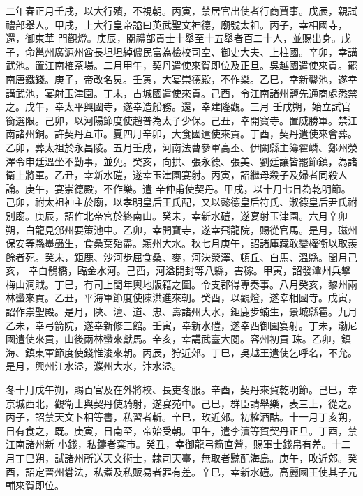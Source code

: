 \begin{pinyinscope}
 二年春正月壬戌，以大行殯，不視朝。丙寅，禁居官出使者行商賈事。戊辰，親試禮部舉人。甲戌，上大行皇帝謚曰英武聖文神德，廟號太祖。丙子，幸相國寺，還，御東華
 門觀燈。庚辰，閱禮部貢士十舉至十五舉者百二十人，並賜出身。戊子，命邕州廣源州酋長坦坦綽儂民富為檢校司空、御史大夫、上柱國。辛卯，幸講武池。置江南榷茶場。二月甲午，契丹遣使來賀即位及正旦。吳越國遣使來貢。罷南唐鐵錢。庚子，帝改名炅。壬寅，大宴崇德殿，不作樂。乙巳，幸新鑿池，遂幸講武池，宴射玉津園。丁未，占城國遣使來貢。己酉，令江南諸州鹽先通商處悉禁之。戊午，幸太平興國寺，遂幸造船務。還，幸建隆觀。三月
 壬戌朔，始立試官銜選限。己卯，以河陽節度使趙普為太子少保。己丑，幸開寶寺。置威勝軍。禁江南諸州銅。許契丹互市。夏四月辛卯，大食國遣使來貢。丁酉，契丹遣使來會葬。乙卯，葬太祖於永昌陵。五月壬戌，河南法曹參軍高丕、伊闕縣主簿翟嶙、鄭州滎澤令申廷溫坐不勤事，並免。癸亥，向拱、張永德、張美、劉廷讓皆罷節鎮，為諸衛上將軍。乙丑，幸新水磑，遂幸玉津園宴射。丙寅，詔繼母殺子及婦者同殺人論。庚午，宴崇德殿，不作樂。遣
 辛仲甫使契丹。甲戌，以十月七日為乾明節。己卯，祔太祖神主於廟，以孝明皇后王氏配，又以懿德皇后符氏、淑德皇后尹氏祔別廟。庚辰，詔作北帝宮於終南山。癸未，幸新水磑，遂宴射玉津園。六月辛卯朔，白龍見邠州要策池中。乙卯，幸開寶寺，遂幸飛龍院，賜從官馬。是月，磁州保安等縣墨蟲生，食桑葉殆盡。穎州大水。秋七月庚午，詔諸庫藏敢變權衡以取羨餘者死。癸未，鉅鹿、沙河步屈食桑、麥，河決滎澤、頓丘、白馬、溫縣。閏月己亥，
 幸白鶻橋，臨金水河。己酉，河溢開封等八縣，害稼。甲寅，詔發潭州兵擊梅山洞賊。丁巳，有司上閏年輿地版籍之圖。令支郡得專奏事。八月癸亥，黎州兩林蠻來貢。乙丑，平海軍節度使陳洪進來朝。癸酉，以觀燈，遂幸相國寺。戊寅，詔作祟聖殿。是月，陜、澶、道、忠、壽諸州大水，鉅鹿步蝻生，景城縣雹。九月乙未，幸弓箭院，遂幸新修三館。壬寅，幸新水磑，遂幸西御園宴射。丁未，渤尼國遣使來貢，山後兩林蠻來獻馬。辛亥，幸講武臺大閱。容州初貢
 珠。乙卯，鎮海、鎮東軍節度使錢惟浚來朝。丙辰，狩近郊。丁巳，吳越王遣使乞呼名，不允。是月，興州江水溢，濮州大水，汴水溢。



 冬十月戊午朔，賜百官及在外將校、長吏冬服。辛酉，契丹來賀乾明節。己巳，幸京城西北，觀衛士與契丹使騎射，遂宴苑中。己巳，群臣請舉樂，表三上，從之。丙子，詔禁天文卜相等書，私習者斬。辛巳，畋近郊。初榷酒酤。十一月丁亥朔，日有食之，既。庚寅，日南至，帝始受朝。甲午，遣李瀆等賀契丹正旦。丁酉，禁江南諸州新
 小錢，私鑄者棄市。癸丑，幸御龍弓箭直營，賜軍士錢帛有差。十二月丁巳朔，試諸州所送天文術士，隸司天臺，無取者黥配海島。庚午，畋近郊。癸酉，詔定晉州礬法，私煮及私販易者罪有差。辛巳，幸新水磑。高麗國王使其子元輔來賀即位。




\end{pinyinscope}
